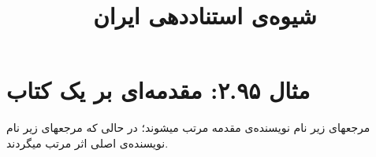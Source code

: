 \documentclass[a4paper,10pt]{article}
\begin{document}
\title{شیوه‌ی استناددهی ایران
 }
\author{}
\date{}
\maketitle



\section*{مثال ۲.۹۵: مقدمه‌ای بر یک کتاب}

مرجعهای \cite{معتمدنژاد1376,friedman1994} زیر نام نویسنده‌ی مقدمه مرتب میشوند؛ در حالی که مرجعهای \cite{قندی1376,hayek1994} زیر نام نویسنده‌ی اصلی اثر مرتب میگردند.






\end{document}
